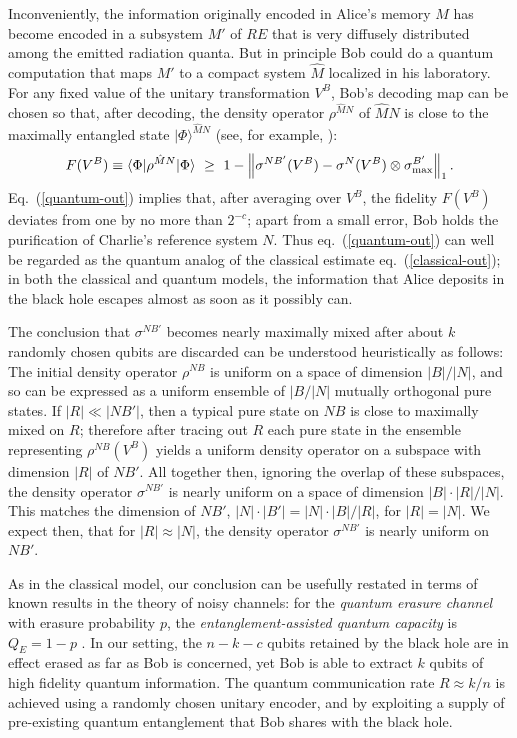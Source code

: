 \documentclass[12pt]{article}
\begin{document}
Inconveniently, the information originally encoded in Alice's memory $M$ has become encoded in a subsystem $M'$ of $RE$ that is very diffusely distributed among the emitted radiation quanta. But in principle Bob could do a quantum computation that maps $M'$ to a compact system $\hat M$ localized in his laboratory. For any fixed value of the unitary transformation $V^B$, Bob's decoding map can be chosen so that, after decoding, the density operator $\rho^{\hat M N}$ of $\hat MN$ is close to the maximally entangled state $|\Phi\rangle^{\hat MN}$ (see, for example, \cite{yard}):
\begin{equation}
F(V^B) \equiv \langle \Phi|\rho^{\hat MN}|\Phi\rangle~\ge ~ 1-\left\| \sigma^{NB'}(V^B)-\sigma^{N}(V^B)\otimes \sigma^{B'}_{\rm max}\right\|_1.
\end{equation}
Eq.~(\ref{quantum-out}) implies that, after averaging over $V^B$, the fidelity $F(V^B)$ deviates from one by no more than $2^{-c}$; apart from a small error, Bob holds the purification of Charlie's reference system $N$. Thus eq.~(\ref{quantum-out}) can well be regarded as the quantum analog of the classical estimate eq.~(\ref{classical-out}); in both the classical and quantum models, the information that Alice deposits in the black hole escapes almost as soon as it possibly can. 

The conclusion that $\sigma^{NB'}$ becomes nearly maximally mixed after about $k$ randomly chosen qubits are discarded can be understood heuristically as follows: The initial density operator $\rho^{NB}$ is uniform on a space of dimension $|B|/|N|$, and so can be expressed as a uniform ensemble of $|B/|N|$ mutually orthogonal pure states.  If $|R| \ll |NB'|$, then a typical pure state on $NB$ is close to maximally mixed on $R$; therefore after tracing out $R$ each pure state in the ensemble representing $\rho^{NB}(V^B)$ yields a uniform density operator on a subspace with dimension $|R|$ of $NB'$. All together then, ignoring the overlap of these subspaces, the density operator $\sigma^{NB'}$ is nearly uniform on a space of dimension $|B|\cdot |R|/|N|$. This matches the dimension of $NB'$, $|N|\cdot |B'|=|N|\cdot |B|/|R|$, for $|R|=|N|$. We expect then, that for $|R|\approx |N|$, the density operator $\sigma^{NB'}$ is nearly uniform on $NB'$. 

As in the classical model, our conclusion can be usefully restated in terms of known results in the theory of noisy channels: for the {\em quantum erasure channel} with erasure probability $p$, the {\em entanglement-assisted quantum capacity} is $Q_E=1-p$ \cite{thapliyal}. In our setting, the $n-k-c$ qubits retained by the black hole are in effect erased as far as Bob is concerned, yet Bob is able to extract $k$ qubits of high fidelity quantum information. The quantum communication rate $R\approx k/n$ is achieved using a randomly chosen unitary encoder, and by exploiting a supply of pre-existing quantum entanglement that Bob shares with the black hole. 
\end{document}
